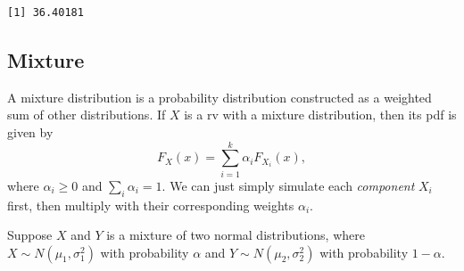 \documentclass[
  letterpaper,
  DIV=11,
  numbers=noendperiod]{scrreprt}
\begin{document}
\begin{verbatim}
[1] 36.40181
\end{verbatim}

\subsection{Mixture}\label{mixture}

A mixture distribution is a probability distribution constructed as a
weighted sum of other distributions. If \(X\) is a rv with a mixture
distribution, then its pdf is given by \[
F_X(x) = \sum_{i=1}^k \alpha_i F_{X_i}(x),
\] where \(\alpha_i\ge 0\) and \(\sum_i \alpha_i=1\). We can just simply
simulate each \emph{component} \(X_i\) first, then multiply with their
corresponding weights \(\alpha_i\).

Suppose \(X\) and \(Y\) is a mixture of two normal distributions, where
\(X\sim N(\mu_1,\sigma_1^2)\) with probability \(\alpha\) and
\(Y\sim N(\mu_2,\sigma_2^2)\) with probability \(1-\alpha\).
\end{document}

